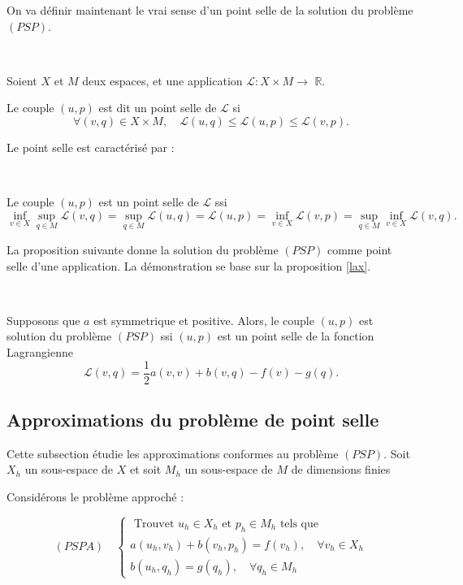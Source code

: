 On va  définir  maintenant le vrai sense d'un point selle de la  solution du  problème $(PSP)$. 

\begin{definition}\
	
Soient  $X$  et  $M$ deux espaces, et une application  $\mathcal{L}: X \times M \rightarrow$ $\mathbb{R}$. 

Le couple  $(u, p)$ est dit un point selle de  $\mathcal{L}$ si 
$$
\forall(v, q) \in X \times M, \quad \mathcal{L}(u, q) \leq \mathcal{L}(u, p) \leq \mathcal{L}(v, p). 
$$
\end{definition}

Le point selle est caractérisé par :

\begin{lemma}\
	
	
	Le couple  $(u, p)$ est un point selle de  $\mathcal{L}$ ssi
$$
\inf _{v \in X} \sup _{q \in M} \mathcal{L}(v, q)=\sup _{q \in M} \mathcal{L}(u, q)=\mathcal{L}(u, p)=\inf _{v \in X} \mathcal{L}(v, p)=\sup _{q \in M} \inf _{v \in X} \mathcal{L}(v, q).
$$

\end{lemma}

La proposition suivante donne la solution du problème $(PSP)$ comme point selle d'une application. La démonstration se base sur la proposition \ref{lax}. 

\begin{proposition}\
	
	
Supposons que $a$ est  symmetrique et positive.  Alors, le couple  $(u, p)$ est solution du problème  $(PSP)$  ssi $(u, p)$ est un point selle de la fonction
 Lagrangienne 
$$
\mathcal{L}(v, q)=\frac{1}{2} a(v, v)+b(v, q)-f(v)-g(q).
$$
\end{proposition}



\subsection{Approximations du problème de point selle}

Cette subsection étudie les approximations conformes au problème $(PSP)$. Soit $X_h$
un sous-espace de $X$ et soit $M_h$  un sous-espace de $M$ de dimensions finies

Considérons le problème approché :

$$
(PSPA)\quad \left\{\begin{array}{l}
	\text { Trouvet  } u_{h} \in X_{h} \text { et  } p_{h} \in M_{h} \text { tels que  } \\
	a\left(u_{h}, v_{h}\right)+b\left(v_{h}, p_{h}\right)=f\left(v_{h}\right), \quad \forall v_{h} \in X_{h} \\
	b\left(u_{h}, q_{h}\right)=g\left(q_{h}\right), \quad \forall q_{h} \in M_{h}
\end{array}\right.
$$


